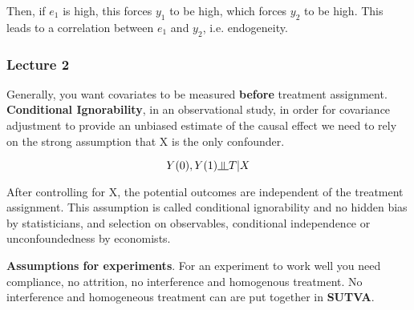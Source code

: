 \documentclass[12 pt, leqno]{article}
\newcommand{\indep}{\rotatebox[origin=c]{90}{$\models$}}
\begin{document}
Then, if $e_1$ is high, this forces $y_1$ to be high, which forces $y_2$ to be high. This leads to a correlation between $e_1$ and $y_2$, i.e. endogeneity. 

\subsubsection{Lecture 2}

Generally, you want covariates to be measured \textbf{before} treatment assignment.  \\

\textbf{Conditional Ignorability}, in an observational study, in order for covariance adjustment to provide an unbiased estimate of the causal effect we need to rely on the strong assumption that X is the only confounder.

$$Y(0), Y(1) \indep T|X $$

After controlling for X, the potential outcomes are independent of the treatment assignment. This assumption is called conditional ignorability and no hidden bias by statisticians, and selection on observables, conditional independence or unconfoundedness by economists. 

\textbf{Assumptions for experiments}. For an experiment to work well you need compliance, no attrition, no interference and homogenous treatment. No interference and homogeneous treatment can are put together in \textbf{SUTVA}. 
\end{document}
